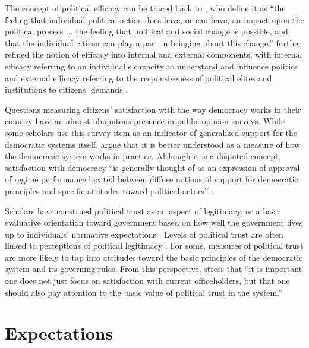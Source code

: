 \documentclass[12pt, letter]{article}
\begin{document}
The concept of political efficacy can be traced back to \textcite[187]{campbell1954voter}, who define it as ``the feeling that individual political action does have, or can have, an impact upon the political process ... the feeling that political and social change is possible, and that the individual citizen can play a part in bringing about this change.'' \textcite{lane1959why} further refined the notion of efficacy into internal and external components, with internal efficacy referring to an individual's capacity to understand and influence politics and external efficacy referring to the responsiveness of political elites and institutions to citizens' demands \parencite{niemi1991winning}.

Questions measuring citizens' satisfaction with the way democracy works in their country have an almost ubiquitous presence in public opinion surveys. While some scholars use this survey item as an indicator of generalized support for the democratic systems itself, \textcite{linde2003satisfaction} argue that it is better understood as a measure of how the democratic system works in practice. Although it is a disputed concept, satisfaction with democracy ``is generally thought of as an expression of approval of regime performance located between diffuse notions of support for democratic principles and specific attitudes toward political actors'' \parencite[86]{blais2017election}.

Scholars have construed political trust as an aspect of legitimacy, or a basic evaluative orientation toward government based on how well the government lives up to individuals' normative expectations \parencite{hetherington1998political, citrin2018trust}. Levels of political trust are often linked to perceptions of political legitimacy \parencite{anderson2008sensitive}. For some, measures of political trust are more likely to tap into attitudes toward the basic principles of the democratic system and its governing rules. From this perspective, \textcite[48]{hooghe2016elections} stress that ``it is important one does not just focus on satisfaction with current officeholders, but that one should also pay attention to the basic value of political trust in the system.''


\section{Expectations}
\end{document}
